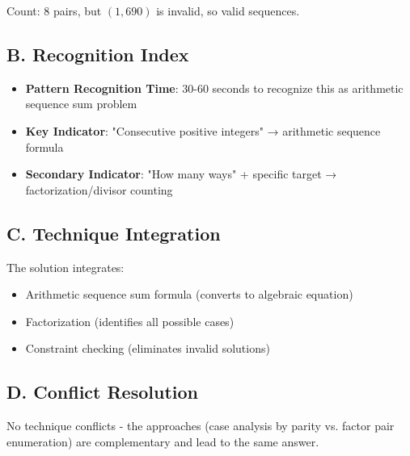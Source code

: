 \documentclass[11pt]{article}
\begin{document}
\begin{conversionbox}
\begin{enumerate}[leftmargin=*]
    Count: 8 pairs, but $(1, 690)$ is invalid, so  valid sequences.
\end{enumerate}

\subsection*{B. Recognition Index}
\begin{itemize}[leftmargin=*]
    \item \textbf{Pattern Recognition Time}: 30-60 seconds to recognize this as arithmetic sequence sum problem
    \item \textbf{Key Indicator}: "Consecutive positive integers" → arithmetic sequence formula
    \item \textbf{Secondary Indicator}: "How many ways" + specific target → factorization/divisor counting
\end{itemize}

\subsection*{C. Technique Integration}
The solution integrates:
\begin{itemize}
    \item Arithmetic sequence sum formula (converts to algebraic equation)
    \item Factorization (identifies all possible cases)
    \item Constraint checking (eliminates invalid solutions)
\end{itemize}

\subsection*{D. Conflict Resolution}
No technique conflicts - the approaches (case analysis by parity vs. factor pair enumeration) are complementary and lead to the same answer.
\end{conversionbox}
\end{document}
